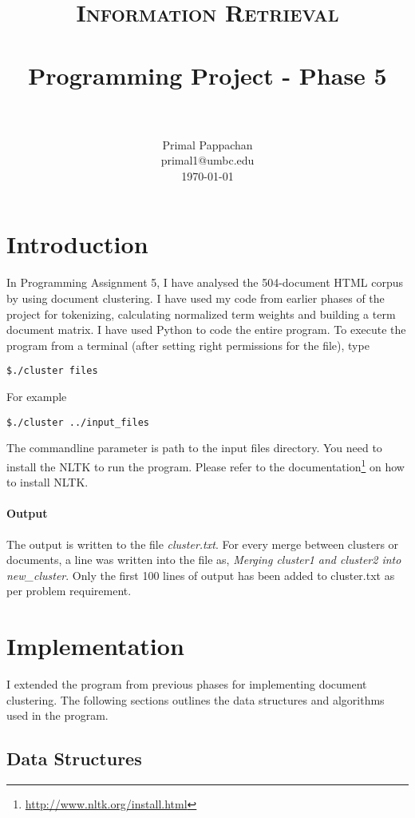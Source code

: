 \documentclass[paper=a4, fontsize=11pt]{scrartcl}
\title{
		\usefont{OT1}{bch}{b}{n}
		\normalfont \normalsize \textsc{Information Retrieval} \\ [25pt]
		\horrule{0.5pt} \\[0.4cm]
		\huge Programming Project - Phase 5 \\
		\horrule{2pt} \\[0.5cm]
}
\author{
		\normalfont 								\normalsize
        Primal Pappachan\\[-3pt]		\normalsize
        primal1@umbc.edu\\[-3pt]		\normalsize
        \today
}
\date{}
\numberwithin{equation}{section}		%
\numberwithin{figure}{section}			%
\numberwithin{table}{section}				%
\begin{document}
\maketitle
\section{Introduction}
In Programming Assignment 5, I have analysed the 504-document HTML corpus by using document clustering. I have used my code from earlier phases of the project for tokenizing, calculating normalized term weights and building a term document matrix. I have used Python to code the entire program. To execute the program from a terminal (after setting right permissions for the file), type 

\begin{verbatim}
$./cluster files 
\end{verbatim}

For example
\begin{verbatim}
$./cluster ../input_files 
\end{verbatim}

The commandline parameter is path to the input files directory. You need to install the NLTK to run the program. Please refer to the documentation\footnote{\url{http://www.nltk.org/install.html}} on how to install NLTK.

\paragraph{Output}

The output is written to the file \textit{cluster.txt}. For every merge between clusters or documents, a line was written into the file as, \textit{Merging cluster1 and cluster2 into new\_cluster}. Only the first 100 lines of output has been added to cluster.txt as per problem requirement.

\section{Implementation}

I extended the program from previous phases for implementing document clustering. The following sections outlines the data structures and algorithms used in the program.

\subsection{Data Structures}
\end{document}
